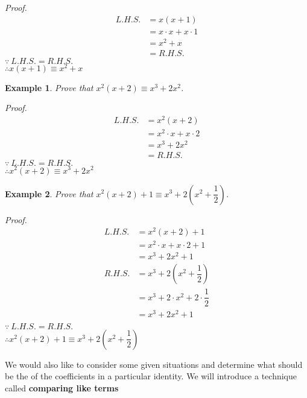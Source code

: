 \documentclass[12pt]{article}
\newtheorem{example}{Example}
\renewenvironment{proof}{\textit{Proof. }}{\hfill\qedsymbol}
\begin{document}
    \begin{proof}
        \begin{align*}
            L.H.S.&=x(x+1)\\
            &=x\cdot x+x\cdot 1\\
            &=x^2+x\\
            &=R.H.S.
        \end{align*}
        $\because\ L.H.S.=R.H.S.$\\
        $\therefore x(x+1)\equiv x^2+x$
    \end{proof}

    \begin{example}
        Prove that $x^2(x+2)\equiv x^3+2x^2$.
    \end{example}

    \begin{proof}
        \begin{align*}
            L.H.S.&=x^2(x+2)\\
            &=x^2\cdot x+x\cdot 2\\
            &=x^3+2x^2\\
            &=R.H.S.
        \end{align*}
        $\because\ L.H.S.=R.H.S.$\\
        $\therefore x^2(x+2)\equiv x^3+2x^2$
    \end{proof}

    \begin{example}
        Prove that $x^2(x+2)+1\equiv x^3+2(x^2+\dfrac{1}{2})$.
    \end{example}

    \begin{proof}
        \begin{align*}
            L.H.S.&=x^2(x+2)+1\\
            &=x^2\cdot x+x\cdot 2+1\\
            &=x^3+2x^2+1\\
            R.H.S.&=x^3+2(x^2+\dfrac{1}{2})\\
            &=x^3+2\cdot x^2+2\cdot\dfrac{1}{2}\\
            &=x^3+2x^2+1\\
        \end{align*}
        $\because\ L.H.S.=R.H.S.$\\
        $\therefore x^2(x+2)+1\equiv x^3+2(x^2+\dfrac{1}{2})$
    \end{proof}

    We would also like to consider some given situations and determine what should be the of the coefficients in a particular identity. We will introduce a technique called \textbf{comparing like terms} 
\end{document}
